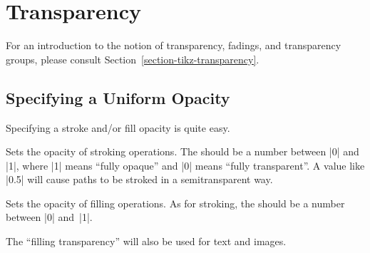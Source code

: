 %
%
%


\section{Transparency}
\label{section-transparency}

For an introduction to the notion of transparency, fadings, and transparency
groups, please consult Section~\ref{section-tikz-transparency}.


\subsection{Specifying a Uniform Opacity}

Specifying a stroke and/or fill opacity is quite easy.

\begin{command}{\pgfsetstrokeopacity{}}
    Sets the opacity of stroking operations. The  should be a
    number between |0| and |1|, where |1| means ``fully opaque'' and |0| means
    ``fully transparent''. A value like |0.5| will cause paths to be stroked in
    a semitransparent way.
\begin{codeexample}[]
\begin{pgfpicture}
  \pgfsetlinewidth{5mm}
  \color{red}
  \pgfpathcircle{\pgfpoint{0cm}{0cm}}{10mm} 
  \color{black}
  \pgfpathcircle{\pgfpoint{1cm}{0cm}}{10mm} 
\end{pgfpicture}
\end{codeexample}
\end{command}

\begin{command}{\pgfsetfillopacity{}}
    Sets the opacity of filling operations. As for stroking, the 
    should be a number between |0| and~|1|.

    The ``filling transparency'' will also be used for text and images.
\begin{codeexample}[]
\end{codeexample}
\end{command}

